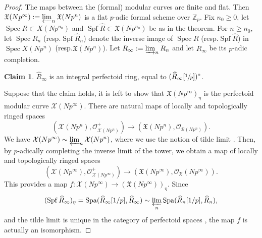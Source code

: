 \documentclass[11pt]{article}
\newcommand{\resp}{resp.\xspace}
\numberwithin{equation}{section}
\theoremstyle{definition}
\newtheorem*{claim}{Claim}
\newcommand{\bb}[1]{\mathbb{#1}}
\newcommand{\n}[1]{\mathcal{#1}}
\newcommand{\f}[1]{\mathfrak{#1}}
\newcommand{\s}[1]{\mathscr{#1}}
\DeclareMathOperator{\Spf}{Spf}
\DeclareMathOperator{\Spec}{Spec}
\DeclareMathOperator{\Spa}{Spa}
\newcommand{\mc}[1]{X(Np^{#1})}
\newcommand{\fmc}[1]{\mathfrak{X}(Np^{#1})}
\begin{document}
\begin{proof}
The maps between the (formal) modular curves are finite and flat. Then $\fmc{\infty}:=\varprojlim_{n} \fmc{n}$ is a flat $p$-adic formal scheme over $\bb{Z}_p$. Fix $n_0\geq 0$, let $\Spec R\subset \mc{n_0}$ and $\Spf \widehat{R}\subset \fmc{n_0}$ be as in the theorem. For $n\geq n_0$, let $\Spec R_n$ (\resp $\Spf \widehat{R}_n$) denote the inverse image of $\Spec R$ (\resp $\Spf \widehat{R}$) in $\Spec \mc{n}$ (\resp $\fmc{n}$). Let $R_{\infty}:=\varinjlim_n R_n$ and let $\widehat{R}_{\infty}$ be its $p$-adic completion.

\begin{claim} $\widehat{R}_{\infty}$ is an integral perfectoid ring, equal to $(\widehat{R}_{\infty}[\sfrac{1}{p}])^{\circ}$.
\end{claim}

Suppose that the claim holds, it is left to show that $\f{X}(Np^\infty)_{\eta}$ is the perfectoid modular curve $\n{X}(Np^\infty)$. There are natural maps of locally and topologically ringed spaces
\[(\n{X}(Np^n), \s{O}^+_{\n{X}(Np^n)})\to (\f{X}(Np^n), \s{O}_{\f{X}(Np^n)}).\]
We have $\n{X}(Np^{\infty})\sim \varprojlim_n \n{X}(Np^n)$, where we use the notion of tilde limit \cite[Def.\,2.4.1]{scholze2013moduli}. Then, by $p$-adically completing the inverse limit of the tower, we obtain a map of locally and topologically ringed spaces
\[
(\n{X}(Np^\infty), \s{O}^+_{\n{X}(Np^\infty)})\to (\f{X}(Np^\infty),\s{O}_{\f{X}}(Np^\infty)).
\]
This provides a map $f:\n{X}(Np^\infty)\to (\f{X}(Np^\infty))_{\eta}$. Since
\[
(\Spf \widehat{R}_{\infty})_{\eta} =\Spa(\widehat{R}_\infty[1/p], \widehat{R}_{\infty})\sim \varprojlim_n \Spa(\widehat{R}_n[1/p], \widehat{R}_{n}),
\]
and the tilde limit is unique in the category of perfectoid spaces \cite[Prop.\,2.4.5]{scholze2013moduli}, the map $f$ is actually an isomorphism.
\end{proof}
\end{document}
